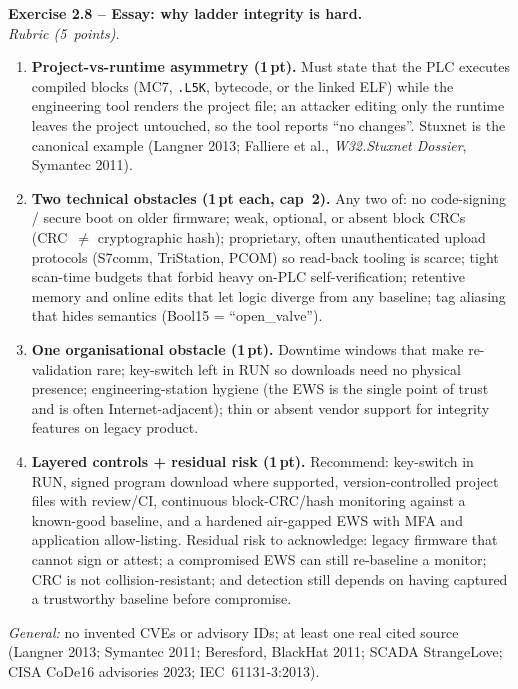 \documentclass[11pt,a4paper]{article}
\begin{document}
\begin{solutionbox}
\textbf{Exercise 2.8 -- Essay: why ladder integrity is hard.}\\[2pt]
\emph{Rubric (5~points).}
\begin{enumerate}\setlength{\itemsep}{0pt}
  \item \textbf{Project-vs-runtime asymmetry (1\,pt).} Must state that the PLC executes compiled
        blocks (MC7, \texttt{.L5K}, bytecode, or the linked ELF) while the engineering tool renders
        the project file; an attacker editing only the runtime leaves the project untouched, so the
        tool reports ``no changes''. Stuxnet is the canonical example (Langner 2013;
        Falliere et al., \emph{W32.Stuxnet Dossier}, Symantec 2011).
  \item \textbf{Two technical obstacles (1\,pt each, cap~2).} Any two of: no code-signing / secure
        boot on older firmware; weak, optional, or absent block CRCs (CRC~$\neq$ cryptographic
        hash); proprietary, often unauthenticated upload protocols (S7comm, TriStation, PCOM) so
        read-back tooling is scarce; tight scan-time budgets that forbid heavy on-PLC
        self-verification; retentive memory and online edits that let logic diverge from any
        baseline; tag aliasing that hides semantics (Bool15 = ``open\_valve'').
  \item \textbf{One organisational obstacle (1\,pt).} Downtime windows that make re-validation
        rare; key-switch left in RUN so downloads need no physical presence; engineering-station
        hygiene (the EWS is the single point of trust and is often Internet-adjacent); thin or
        absent vendor support for integrity features on legacy product.
  \item \textbf{Layered controls + residual risk (1\,pt).} Recommend: key-switch in RUN, signed
        program download where supported, version-controlled project files with review/CI,
        continuous block-CRC/hash monitoring against a known-good baseline, and a hardened
        air-gapped EWS with MFA and application allow-listing. Residual risk to acknowledge: legacy
        firmware that cannot sign or attest; a compromised EWS can still re-baseline a monitor; CRC
        is not collision-resistant; and detection still depends on having captured a trustworthy
        baseline before compromise.
\end{enumerate}
\emph{General:} no invented CVEs or advisory IDs; at least one real cited source (Langner 2013;
Symantec 2011; Beresford, BlackHat 2011; SCADA StrangeLove; CISA CoDe16 advisories 2023;
IEC~61131-3:2013).
\end{solutionbox}
\end{document}
